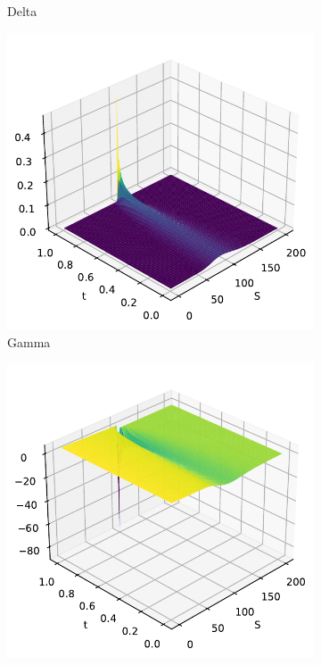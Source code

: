 \begin{figure}[H]
\begin{subfigure}[b]{0.3\linewidth}
        \caption{Delta}
    \end{subfigure}
    \begin{subfigure}[b]{0.3\linewidth}
        \includegraphics[width=\linewidth]{Imagenes/Parte1/6_Sols/Put/Put_Gamma.pdf}
        \caption{Gamma}
    \end{subfigure}
    \begin{subfigure}[b]{0.3\linewidth}
        \includegraphics[width=\linewidth]{Imagenes/Parte1/6_Sols/Put/Put_Theta.pdf}

\end{subfigure}
\end{figure}
